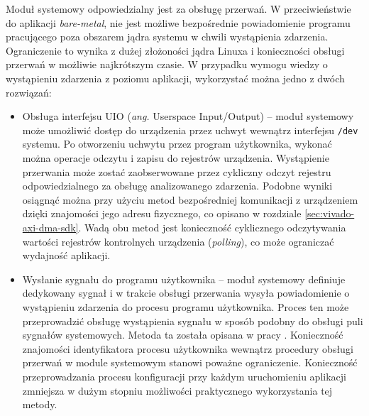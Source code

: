 Moduł systemowy odpowiedzialny jest za obsługę przerwań. W przeciwieństwie do aplikacji \emph{bare-metal}, nie jest możliwe bezpośrednie powiadomienie programu pracującego poza obszarem jądra systemu w chwili wystąpienia zdarzenia. Ograniczenie to wynika z dużej złożoności jądra Linuxa i konieczności obsługi przerwań w możliwie najkrótszym czasie.
W przypadku wymogu wiedzy o wystąpieniu zdarzenia z poziomu aplikacji, wykorzystać można jedno z dwóch rozwiązań:
\begin{itemize}
	\item Obsługa interfejsu UIO (\emph{ang.} Userspace Input/Output) -- moduł systemowy może umożliwić dostęp do urządzenia przez uchwyt wewnątrz interfejsu \texttt{/dev} systemu. Po otworzeniu uchwytu przez program użytkownika, wykonać można operacje odczytu i zapisu do rejestrów urządzenia. Wystąpienie przerwania może zostać zaobserwowane przez cykliczny odczyt rejestru odpowiedzialnego za obsługę analizowanego zdarzenia. Podobne wyniki osiągnąć można przy użyciu metod bezpośredniej komunikacji z urządzeniem dzięki znajomości jego adresu fizycznego, co opisano w rozdziale \ref{sec:vivado-axi-dma-sdk}.
	Wadą obu metod jest konieczność cyklicznego odczytywania wartości rejestrów kontrolnych urządzenia (\emph{polling}), co może ograniczać wydajność aplikacji.
	
	\item Wysłanie sygnału do programu użytkownika -- moduł systemowy definiuje dedykowany sygnał i w trakcie obsługi przerwania wysyła powiadomienie o wystąpieniu zdarzenia do procesu programu użytkownika. Proces ten może przeprowadzić obsługę wystąpienia sygnału w sposób podobny do obsługi puli sygnałów systemowych. Metoda ta została opisana w pracy \cite{Bovet2002}. 
	Konieczność znajomości identyfikatora procesu użytkownika wewnątrz procedury obsługi przerwań w module systemowym stanowi poważne ograniczenie. Konieczność przeprowadzania procesu konfiguracji przy każdym uruchomieniu aplikacji zmniejsza w dużym stopniu możliwości praktycznego wykorzystania tej metody.
\end{itemize}

